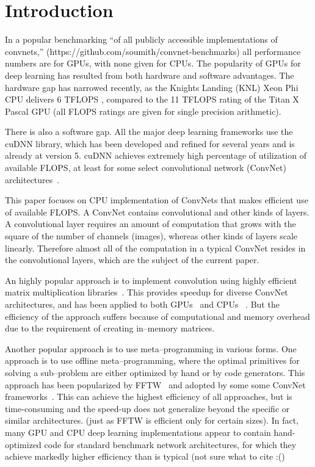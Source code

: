 \section{Introduction}

  In a popular benchmarking ``of all publicly accessible
  implementations of convnets,''
  (https://github.com/soumith/convnet-benchmarks) all performance
  numbers are for GPUs, with none given for CPUs.  The popularity of
  GPUs for deep learning has resulted from both hardware and software
  advantages.  The hardware gap has narrowed recently, as the Knights
  Landing (KNL) Xeon Phi CPU delivers 6 TFLOPS \cite{},
  compared to the 11 TFLOPS rating of the Titan X Pascal GPU (all
  FLOPS ratings are given for single precision arithmetic).

  There is also a software gap.  All the major deep learning
  frameworks use the cuDNN library, which has been developed and
  refined for several years and is already at version 5.  cuDNN
  achieves extremely high percentage of utilization of available
  FLOPS, at least for some select convolutional network (ConvNet)
  architectures~\cite{imagenetwinners}.

  This paper focuses on CPU implementation of ConvNets that makes
  efficient use of available FLOPS.  A ConvNet contains convolutional
  and other kinds of layers.  A convolutional layer requires an amount
  of computation that grows with the square of the number of channels
  (images), whereas other kinds of layers scale linearly.  Therefore
  almost all of the computation in a typical ConvNet resides in the
  convolutional layers, which are the subject of the current paper.

  An highly popular approach is to implement convolution using highly
  efficient matrix multiplication
  libraries~\cite{chellapilla2006high}.  This provides speedup for
  diverse ConvNet architectures, and has been applied to both
  GPUs~\cite{chetlur2014cudnn,neonnervana} and CPUs
  ~\cite{hadjis2015shallow}.  But the efficiency of the approach
  suffers because of computational and memory overhead due to the
  requirement of creating in--memory matrices.

  Another popular approach is to use meta--programming in various
  forms.  One approach is to use offline meta--programming, where the
  optimal primitives for solving a sub--problem are either optimized
  by hand or by code generators.  This approach has been popularized
  by FFTW~\cite{frigo1998fftw,frigo1999fftw} and adopted by some some
  ConvNet frameworks~\cite{klockner2012pycuda,nervanagpu}.  This can
  achieve the highest efficiency of all approaches, but is
  time-consuming and the speed-up does not generalize beyond the
  specific or similar architectures.  (just as FFTW is efficient only
  for certain sizes).  In fact, many GPU and CPU deep learning
  implementations appear to contain hand-optimized code for standard
  benchmark network architectures, for which they achieve markedly
  higher efficiency than is typical (not sure what to cite :()

